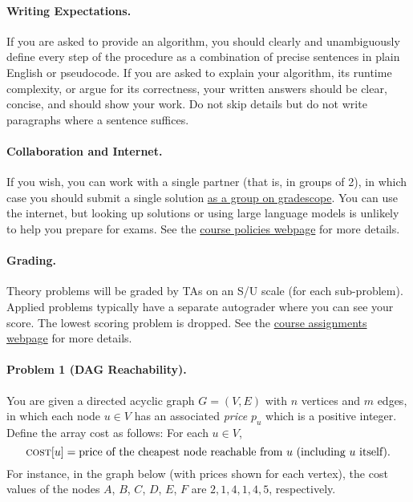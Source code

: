 \documentclass[11pt]{article}
\begin{document}
\paragraph{Writing Expectations.} If you are asked to provide an algorithm, you should clearly and unambiguously define every step of the procedure as a combination of precise sentences in plain English or pseudocode. If you are asked to explain your algorithm, its runtime complexity, or argue for its correctness, your written answers should be clear, concise, and should show your work. Do not skip details but do not write paragraphs where a sentence suffices.

\paragraph{Collaboration and Internet.} If you wish, you can work with a single partner (that is, in groups of 2), in which case you should submit a single solution \href{https://help.gradescope.com/article/m5qz2xsnjy-student-add-group-members}{as a group on gradescope}. You can use the internet, but looking up solutions or using large language models is unlikely to help you prepare for exams. See the \href{https://sites.duke.edu/spring24compsci330/policies/}{course policies webpage} for more details.

\paragraph{Grading.} Theory problems will be graded by TAs on an S/U scale (for each sub-problem). Applied problems typically have a separate autograder where you can see your score. The lowest scoring problem is dropped. See the \href{https://sites.duke.edu/spring24compsci330/assignments/}{course assignments webpage} for more details.





\newpage
\paragraph{Problem 1 (DAG Reachability).} You are given a directed acyclic graph $G = (V, E)$ with $n$ vertices and $m$ edges, in which each node $u \in V$ has an associated {\em price} $p_u$ which is a positive integer. Define the array {\sc cost} as follows: For each $u \in V$,
$$\textsc{cost}[u] = \text{price of the cheapest node reachable from }u 
 \text{ (including }u\text{ itself)}.$$
 For instance, in the graph below (with prices shown for each vertex), the {\sc cost} values of the nodes $A$, $B$, $C$, $D$, $E$, $F$ are $2, 1, 4, 1, 4, 5$, respectively.
\end{document}
